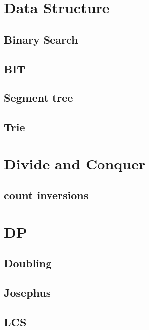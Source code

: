 \section{Data Structure}
        \subsection{Binary Search}
                
        \subsection{BIT}
                
        \subsection{Segment tree}
                
        \subsection{Trie}
                

\section{Divide and Conquer}
        \subsection{count inversions}
                

\section{DP} 
        \subsection{Doubling}
                
        \subsection{Josephus}
                
        \subsection{LCS}
                
